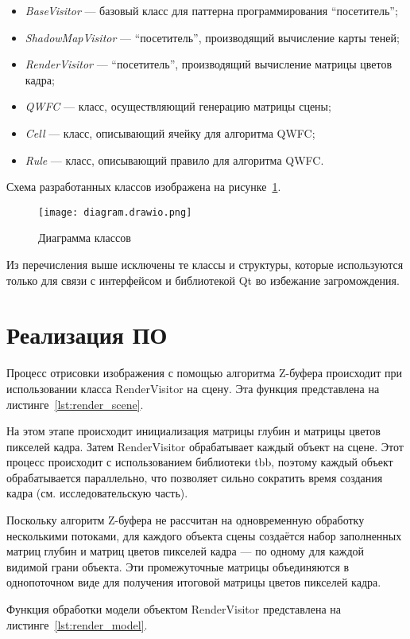 \begin{itemize}
  \item \emph{BaseVisitor} --- базовый класс для паттерна программирования ``посетитель'';
  \item \emph{ShadowMapVisitor} --- ``посетитель'', производящий вычисление карты теней;
  \item \emph{RenderVisitor} --- ``посетитель'', производящий вычисление матрицы цветов кадра;
  \item \emph{QWFC} --- класс, осуществляющий генерацию матрицы сцены;
  \item \emph{Cell} --- класс, описывающий ячейку для алгоритма QWFC;
  \item \emph{Rule} --- класс, описывающий правило для алгоритма QWFC.
\end{itemize}

Схема разработанных классов изображена на рисунке~\ref{fig:UML}.

\begin{figure}[h]
  \texttt{[image: diagram.drawio.png]}
  \caption{Диаграмма классов}
  \label{fig:UML}
\end{figure}

Из перечисления выше исключены те классы и структуры, которые используются только для связи с интерфейсом и библиотекой Qt во избежание загромождения.

\section{Реализация ПО}

Процесс отрисовки изображения с помощью алгоритма Z-буфера происходит при использовании класса RenderVisitor на сцену. 
Эта функция представлена на листинге~\ref{lst:render_scene}. 

На этом этапе происходит инициализация матрицы глубин и матрицы цветов пикселей кадра. Затем RenderVisitor обрабатывает каждый объект на сцене. Этот процесс происходит с использованием библиотеки tbb, поэтому каждый объект обрабатывается параллельно, что позволяет сильно сократить время создания кадра (см. исследовательскую часть).

Поскольку алгоритм Z-буфера не рассчитан на одновременную обработку несколькими потоками, для каждого объекта сцены создаётся набор заполненных матриц глубин и матриц цветов пикселей кадра --- по одному для каждой видимой грани объекта. 
Эти промежуточные матрицы объединяются в однопоточном виде для получения итоговой матрицы цветов пикселей кадра.

Функция обработки модели объектом RenderVisitor представлена на листинге~\ref{lst:render_model}.

